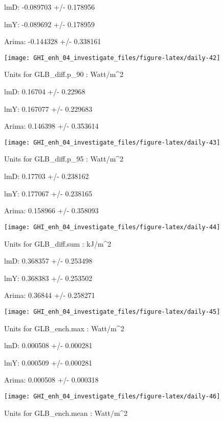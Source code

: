 \documentclass[
  10pt,
  a4paper,oneside]{article}
\begin{document}
lmD: -0.089703 +/- 0.178956

lmY: -0.089692 +/- 0.178959

Arima: -0.144328 +/- 0.338161

\begin{center}\texttt{[image: GHI\_enh\_04\_investigate\_files/figure-latex/daily-42]} \end{center}

Units for GLB\_diff.p\_90 : Watt/m\^{}2

lmD: 0.16704 +/- 0.22968

lmY: 0.167077 +/- 0.229683

Arima: 0.146398 +/- 0.353614

\begin{center}\texttt{[image: GHI\_enh\_04\_investigate\_files/figure-latex/daily-43]} \end{center}

Units for GLB\_diff.p\_95 : Watt/m\^{}2

lmD: 0.17703 +/- 0.238162

lmY: 0.177067 +/- 0.238165

Arima: 0.158966 +/- 0.358093

\begin{center}\texttt{[image: GHI\_enh\_04\_investigate\_files/figure-latex/daily-44]} \end{center}

Units for GLB\_diff.sum : kJ/m\^{}2

lmD: 0.368357 +/- 0.253498

lmY: 0.368383 +/- 0.253502

Arima: 0.36844 +/- 0.258271

\begin{center}\texttt{[image: GHI\_enh\_04\_investigate\_files/figure-latex/daily-45]} \end{center}

Units for GLB\_ench.max : Watt/m\^{}2

lmD: 0.000508 +/- 0.000281

lmY: 0.000509 +/- 0.000281

Arima: 0.000508 +/- 0.000318

\begin{center}\texttt{[image: GHI\_enh\_04\_investigate\_files/figure-latex/daily-46]} \end{center}

Units for GLB\_ench.mean : Watt/m\^{}2
\end{document}
